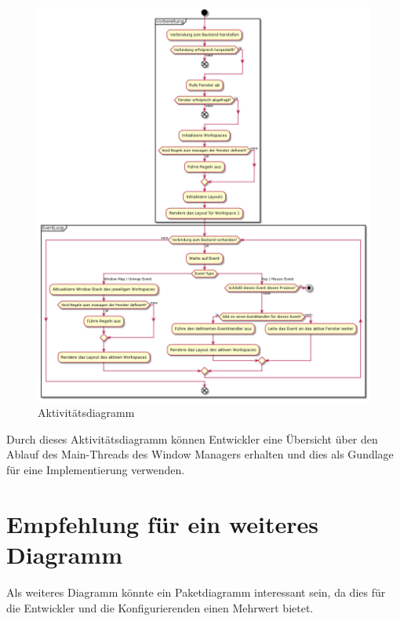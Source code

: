 \documentclass{article}
\begin{document}
\begin{figure}[h]
	\centering
	\includegraphics[height=0.7\textheight]{activity}
	\caption{Aktivitätsdiagramm}
\end{figure}

\vfill

Durch dieses Aktivitätsdiagramm können Entwickler eine Übersicht über den
Ablauf des Main-Threads des Window Managers erhalten und dies als Gundlage
für eine Implementierung verwenden.

\section{Empfehlung für ein weiteres Diagramm}

Als weiteres Diagramm könnte ein Paketdiagramm interessant sein, da dies für
die Entwickler und die Konfigurierenden einen Mehrwert bietet.
\end{document}
